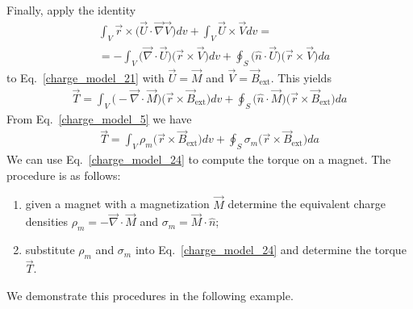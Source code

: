 \documentclass[11pt,a4paper,oneside]{book}
\numberwithin{equation}{section}
\theoremstyle{it}
\theoremstyle{definition}
\begin{document}
Finally, apply the identity
\begin{equation*}\label{}
	\begin{aligned}
		& \int_{V}\vec{r}\times\Big(\vec{U}\cdot\vec{\nabla}\vec{V}\Big)dv + \int_{V} \vec{U}\times\vec{V}dv =  \\[6pt]
		&= - \int_{V} \Big(\vec{\nabla}\cdot\vec{U}\Big)\Big(\vec{r}\times\vec{V}\Big)dv+\oint_{S}\Big(\hat{n}\cdot\vec{U}\Big)\Big(\vec{r}\times\vec{V}\Big)da
	\end{aligned}
\end{equation*} 
to Eq.~\eqref{charge_model_21} with $\vec{U}=\vec{M}$ and $\vec{V}=\vec{B}_\text{ext}$. This yields
\begin{equation}\label{charge_model_23}
	{\begin{aligned}
			\vec{T} = \int_{V}\Big(-\vec{\nabla}\cdot\vec{M}\Big)\Big(\vec{r}\times\vec{B}_\text{ext}\Big)dv + \oint_{S} \Big(\hat{n}\cdot\vec{M}\Big)\Big(\vec{r}\times\vec{B}_\text{ext}\Big)da
	\end{aligned}}
\end{equation} 
From Eq.~\eqref{charge_model_5} we have
\begin{equation}\label{charge_model_24}
	\boxed{\begin{aligned}
			\vec{T} = \int_{V}\rho_m\Big(\vec{r}\times\vec{B}_\text{ext}\Big)dv + \oint_{S} \sigma_m\Big(\vec{r}\times\vec{B}_\text{ext}\Big)da
	\end{aligned}}
\end{equation} 
We can use Eq.~\eqref{charge_model_24} to compute the torque on a magnet. The procedure is as follows:
\begin{enumerate}
	\item given a magnet with a magnetization $\vec{M}$ determine the equivalent charge densities $\rho_m=-\vec{\nabla}\cdot\vec{M}$ and $\sigma_m=\vec{M}\cdot\hat{n}$;
	\item substitute $\rho_m$ and $\sigma_m$ into Eq.~\eqref{charge_model_24} and determine the torque $\vec{T}$.
\end{enumerate}
We demonstrate this procedures in the following example.
\end{document}
